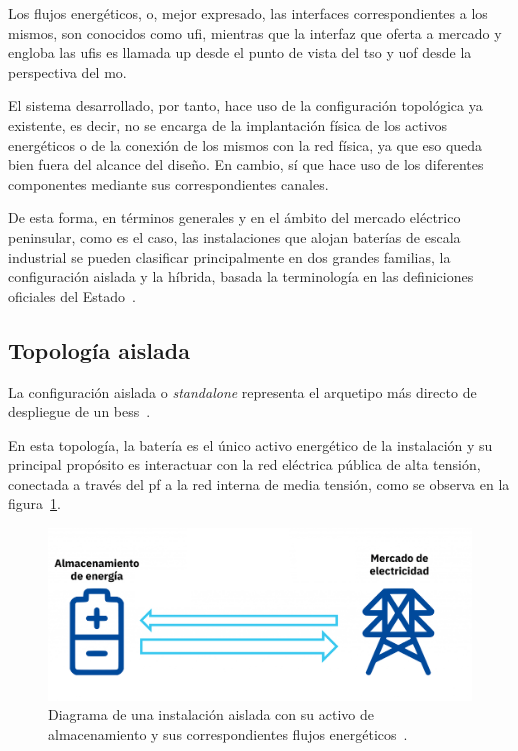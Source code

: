 Los flujos energéticos, o, mejor expresado, las interfaces correspondientes a los mismos, son conocidos como \gls{ufi}, mientras que la interfaz que oferta a mercado y engloba las \glspl{ufi} es llamada \gls{up} desde el punto de vista del \gls{tso} y \gls{uof} desde la perspectiva del \gls{mo}.

El sistema desarrollado, por tanto, hace uso de la configuración topológica ya existente, es decir, no se encarga de la implantación física de los activos energéticos o de la conexión de los mismos con la red física, ya que eso queda bien fuera del alcance del diseño. En cambio, sí que hace uso de los diferentes componentes mediante sus correspondientes canales.

De esta forma, en términos generales y en el ámbito del mercado eléctrico peninsular, como es el caso, las instalaciones que alojan baterías de escala industrial se pueden clasificar principalmente en dos grandes familias, la configuración aislada y la híbrida, basada la terminología en las definiciones oficiales del Estado~\cite{cnmc2024servicios}.

\subsection{Topología aislada}%
\label{makereference3.1.1}

La configuración aislada o \textit{standalone} representa el arquetipo más directo de despliegue de un \gls{bess}~\cite{gallo2023stand}.

En esta topología, la batería es el único activo energético de la instalación y su principal propósito es interactuar con la red eléctrica pública de alta tensión, conectada a través del \gls{pf} a la red interna de media tensión, como se observa en la figura~\ref{fig:topologia-aislada}.

\begin{figure}
  \centering
  \includegraphics[width=0.5\linewidth]{figures/topologia-aislada.png}
  \caption[Diagrama de una instalación aislada.]{Diagrama de una instalación aislada con su activo de almacenamiento y sus correspondientes flujos energéticos~\cite{aleasoft2025la}.}%
  \label{fig:topologia-aislada}
\end{figure}


